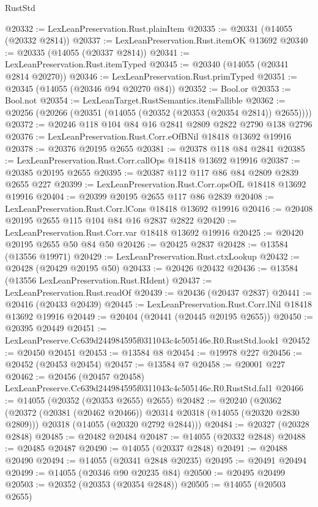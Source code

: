 \begin{lexlean}{RustStd}
\begin{coremodule}
@20332 := LexLeanPreservation.Rust.plainItem
@20335 := @20331 (@14055 (@20332 @2814))
@20337 := LexLeanPreservation.Rust.itemOK @13692
@20340 := @20335 (@14055 (@20337 @2814))
@20341 := LexLeanPreservation.Rust.itemTyped
@20345 := @20340 (@14055 (@20341 @2814 @20270))
@20346 := LexLeanPreservation.Rust.primTyped
@20351 := @20345 (@14055 (@20346 @94 @20270 @84))
@20352 := Bool.or
@20353 := Bool.not
@20354 := LexLeanTarget.RustSemantics.itemFallible
@20362 := @20256 (@20266 (@20351 (@14055 (@20352 (@20353 (@20354 @2814)) @2655))))
@20372 := @20246 @118 @104 @84 @16 @2841 @2809 @2822 @2790 @138 @2796
@20376 := LexLeanPreservation.Rust.Corr.eOfBNil @18418 @13692 @19916
@20378 := @20376 @20195 @2655
@20381 := @20378 @118 @84 @2841
@20385 := LexLeanPreservation.Rust.Corr.callOps @18418 @13692 @19916
@20387 := @20385 @20195 @2655
@20395 := @20387 @112 @117 @86 @84 @2809 @2839 @2655 @227
@20399 := LexLeanPreservation.Rust.Corr.opsOfL @18418 @13692 @19916
@20404 := @20399 @20195 @2655 @117 @86 @2839
@20408 := LexLeanPreservation.Rust.Corr.lCons @18418 @13692 @19916
@20416 := @20408 @20195 @2655 @115 @104 @84 @16 @2837 @2822
@20420 := LexLeanPreservation.Rust.Corr.var @18418 @13692 @19916
@20425 := @20420 @20195 @2655 @50 @84 @50
@20426 := @20425 @2837
@20428 := @13584 (@13556 @19971)
@20429 := LexLeanPreservation.Rust.ctxLookup
@20432 := @20428 (@20429 @20195 @50)
@20433 := @20426 @20432
@20436 := @13584 (@13556 LexLeanPreservation.Rust.RIdent)
@20437 := LexLeanPreservation.Rust.readOf
@20439 := @20436 (@20437 @2837)
@20441 := @20416 (@20433 @20439)
@20445 := LexLeanPreservation.Rust.Corr.lNil @18418 @13692 @19916
@20449 := @20404 (@20441 (@20445 @20195 @2655))
@20450 := @20395 @20449
@20451 := LexLeanPreserve.Cc639d244984595f0311043c4c505146e.R0.RustStd.look1
@20452 := @20450 @20451
@20453 := @13584 @8
@20454 := @19978 @227
@20456 := @20452 (@20453 @20454)
@20457 := @13584 @7
@20458 := @20001 @227
@20462 := @20456 (@20457 @20458) LexLeanPreserve.Cc639d244984595f0311043c4c505146e.R0.RustStd.fal1
@20466 := @14055 (@20352 (@20353 @2655) @2655)
@20482 := @20240
    (@20362
      (@20372 (@20381 (@20462 @20466)) @20314 @20318 (@14055 (@20320 @2830 @2809)))
      @20318
      (@14055 (@20320 @2792 @2844)))
@20484 := @20327 (@20328 @2848)
@20485 := @20482 @20484
@20487 := @14055 (@20332 @2848)
@20488 := @20485 @20487
@20490 := @14055 (@20337 @2848)
@20491 := @20488 @20490
@20494 := @14055 (@20341 @2848 @20235)
@20495 := @20491 @20494
@20499 := @14055 (@20346 @90 @20235 @84)
@20500 := @20495 @20499
@20503 := @20352 (@20353 (@20354 @2848))
@20505 := @14055 (@20503 @2655)

\end{coremodule}
\end{lexlean}
